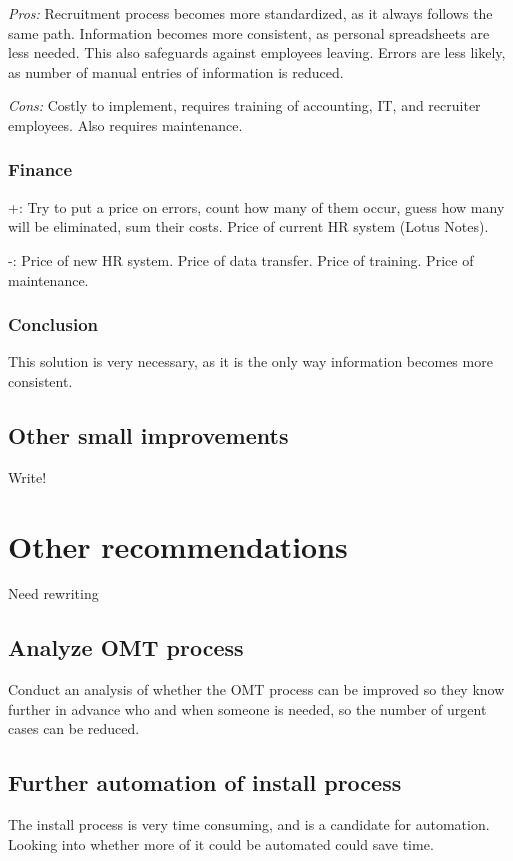 \emph{Pros:} Recruitment process becomes more standardized, as it always follows the same path.
Information becomes more consistent, as personal spreadsheets are less needed. 
This also safeguards against employees leaving.
Errors are less likely, as number of manual entries of information is reduced.

\emph{Cons:} Costly to implement, requires training of accounting, IT, and recruiter employees.
Also requires maintenance.

\subsubsection{Finance} +: Try to put a price on errors, count how many of them occur, guess how many will be eliminated, sum their costs.
Price of current HR system (Lotus Notes).

-: Price of new HR system.
Price of data transfer.
Price of training.
Price of maintenance.

\subsubsection{Conclusion} This solution is very necessary, as it is the only way information becomes more consistent.

\subsection{Other small improvements}

Write! 

\section{Other recommendations}
Need rewriting 

\subsection{Analyze OMT process}
Conduct an analysis of whether the OMT process can be improved so they know further in advance who and when someone is needed, so the number of urgent cases can be reduced.

\subsection{Further automation of install process}
The install process is very time consuming, and is a candidate for automation.
Looking into whether more of it could be automated could save time.
